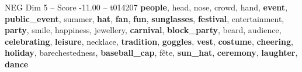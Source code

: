 \begin{textsample}{NEG Dim 5 – Score -11.00 – t014207}  \label{ex:f5_neg_002}
\textbf{people}, head, nose, crowd, hand, \textbf{event}, \textbf{public\_event}, summer, \textbf{hat}, \textbf{fan}, \textbf{fun}, \textbf{sunglasses}, \textbf{festival}, entertainment, \textbf{party}, smile, happiness, jewellery, \textbf{carnival}, \textbf{block\_party}, beard, audience, \textbf{celebrating}, \textbf{leisure}, necklace, \textbf{tradition}, \textbf{goggles}, \textbf{vest}, \textbf{costume}, \textbf{cheering}, \textbf{holiday}, barechestedness, \textbf{baseball\_cap}, fête, \textbf{sun\_hat}, \textbf{ceremony}, \textbf{laughter}, \textbf{dance}

\end{textsample}
